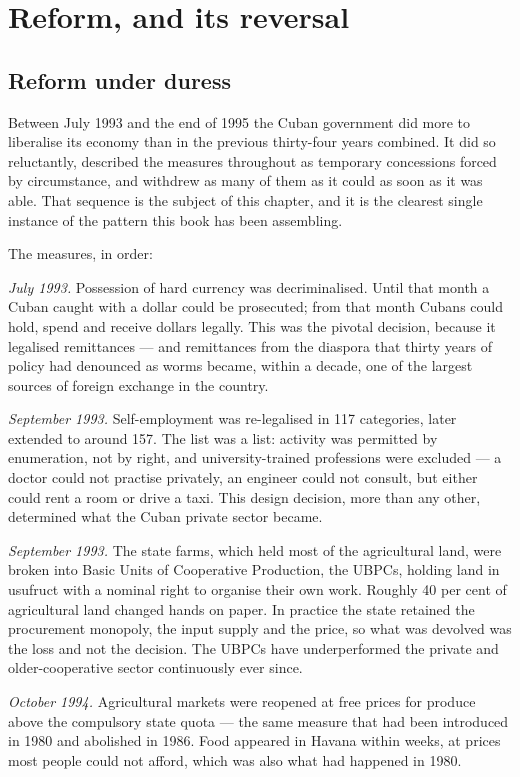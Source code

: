 \chapter{Reform, and its reversal}
\label{ch:dollarreform}

\section{Reform under duress}

Between July 1993 and the end of 1995 the Cuban government did more to
liberalise its economy than in the previous thirty-four years combined. It did
so reluctantly, described the measures throughout as temporary concessions
forced by circumstance, and withdrew as many of them as it could as soon as it
was able. That sequence is the subject of this chapter, and it is the clearest
single instance of the pattern this book has been assembling.

The measures, in order:

\emph{July 1993.} Possession of hard currency was decriminalised. Until that
month a Cuban caught with a dollar could be prosecuted; from that month Cubans
could hold, spend and receive dollars legally. This was the pivotal decision,
because it legalised remittances --- and remittances from the diaspora that
thirty years of policy had denounced as worms became, within a decade, one of
the largest sources of foreign exchange in the country.

\emph{September 1993.} Self-employment was re-legalised in 117 categories, later
extended to around 157. The list was a list: activity was permitted by
enumeration, not by right, and university-trained professions were excluded ---
a doctor could not practise privately, an engineer could not consult, but either
could rent a room or drive a taxi. This design decision, more than any other,
determined what the Cuban private sector became.

\emph{September 1993.} The state farms, which held most of the agricultural
land, were broken into Basic Units of Cooperative Production, the UBPCs, holding
land in usufruct with a nominal right to organise their own work. Roughly 40 per
cent of agricultural land changed hands on paper.\unv{} In practice the state
retained the procurement monopoly, the input supply and the price, so what was
devolved was the loss and not the decision. The UBPCs have underperformed the
private and older-cooperative sector continuously ever since.

\emph{October 1994.} Agricultural markets were reopened at free prices for
produce above the compulsory state quota --- the same measure that had been
introduced in 1980 and abolished in 1986. Food appeared in Havana within weeks,
at prices most people could not afford, which was also what had happened in
1980.

